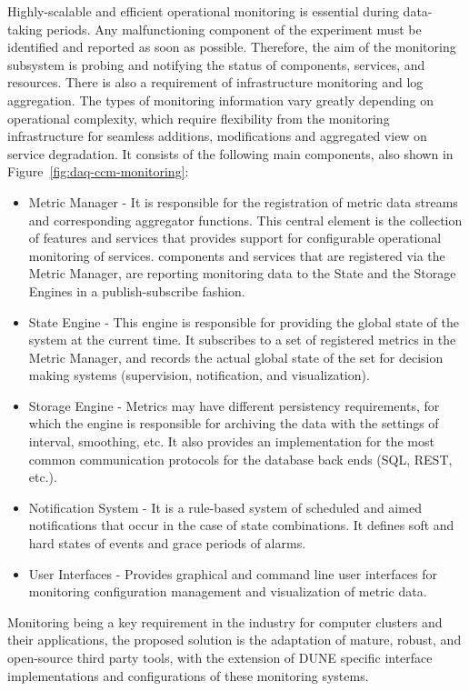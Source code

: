 Highly-scalable and efficient operational monitoring is essential during data-taking periods. Any malfunctioning component of the experiment must be identified and reported as soon as possible. Therefore, the aim of the monitoring subsystem is probing and notifying the status of  components, services, and resources. There is also a requirement of  infrastructure monitoring and log aggregation. The types of monitoring information vary greatly depending on operational complexity, which require flexibility from the monitoring infrastructure for seamless additions, modifications and aggregated view on service degradation.
It consists of the following main components, also shown in Figure~\ref{fig:daq-ccm-monitoring}:


\begin{itemize}
  \item Metric Manager - It is responsible for the registration of metric data streams and corresponding aggregator functions. This central element is the collection of features and services that provides support for configurable operational monitoring of  services.  components and services that are registered via the Metric Manager, are reporting monitoring data to the State and the Storage Engines in a publish-subscribe fashion. 
  \item State Engine - This engine is responsible for providing the global state of the system at the current time. It subscribes to a set of registered metrics in the Metric Manager, and records the actual global state of the set for decision making systems (supervision, notification, and visualization).
  \item Storage Engine - Metrics may have different persistency requirements, for which the engine is responsible for archiving the data with the settings of interval, smoothing, etc. It also provides an implementation for the most common communication protocols for the database back ends (SQL, REST, etc.).
  \item Notification System - It is a rule-based system of scheduled and aimed notifications that occur in the case of state combinations. It defines soft and hard states of events and grace periods of alarms.
  \item User Interfaces - Provides graphical and command line user interfaces for monitoring configuration management and visualization of metric data.
\end{itemize}

Monitoring being a key requirement in the industry for computer clusters and their applications, the proposed solution is the adaptation of mature, robust, and open-source third party tools, with the extension of DUNE  specific interface implementations and configurations of these monitoring systems. 


